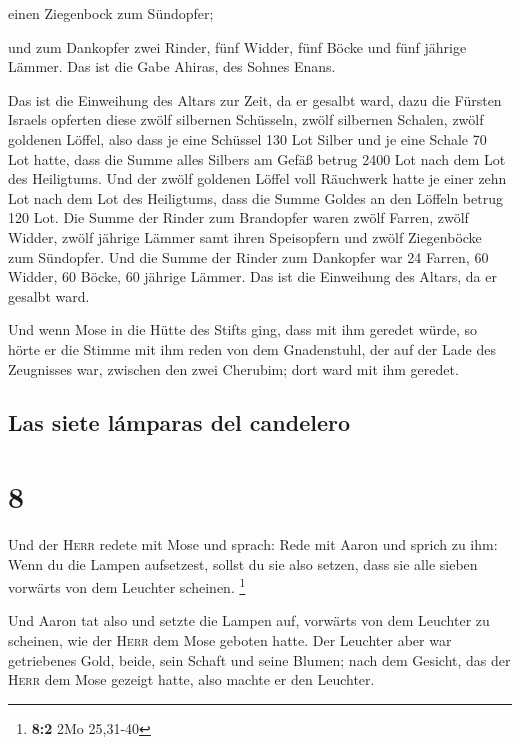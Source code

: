  einen Ziegenbock zum Sündopfer;

 und zum Dankopfer zwei Rinder, fünf Widder, fünf Böcke
und fünf jährige Lämmer. Das ist die Gabe Ahiras, des Sohnes Enans.

 Das ist die Einweihung des Altars zur Zeit, da er
gesalbt ward, dazu die Fürsten Israels opferten diese zwölf silbernen
Schüsseln, zwölf silbernen Schalen, zwölf goldenen Löffel,
 also dass je eine Schüssel 130 Lot Silber und je eine
Schale 70 Lot hatte, dass die Summe alles Silbers am Gefäß betrug 2400
Lot nach dem Lot des Heiligtums.  Und der zwölf goldenen
Löffel voll Räuchwerk hatte je einer zehn Lot nach dem Lot des
Heiligtums, dass die Summe Goldes an den Löffeln betrug 120 Lot.
 Die Summe der Rinder zum Brandopfer waren zwölf Farren,
zwölf Widder, zwölf jährige Lämmer samt ihren Speisopfern und zwölf
Ziegenböcke zum Sündopfer.  Und die Summe der Rinder zum
Dankopfer war 24 Farren, 60 Widder, 60 Böcke, 60 jährige Lämmer. Das ist
die Einweihung des Altars, da er gesalbt ward.

 Und wenn Mose in die Hütte des Stifts ging, dass mit ihm
geredet würde, so hörte er die Stimme mit ihm reden von dem Gnadenstuhl,
der auf der Lade des Zeugnisses war, zwischen den zwei Cherubim; dort
ward mit ihm geredet.

\hypertarget{las-siete-luxe1mparas-del-candelero}{%
\subsection{Las siete lámparas del
candelero}\label{las-siete-luxe1mparas-del-candelero}}

\hypertarget{section-7}{%
\section{8}\label{section-7}}

 Und der \textsc{Herr} redete mit Mose und sprach:
 Rede mit Aaron und sprich zu ihm: Wenn du die Lampen
aufsetzest, sollst du sie also setzen, dass sie alle sieben vorwärts von
dem Leuchter scheinen. \footnote{\textbf{8:2} 2Mo 25,31-40}

 Und Aaron tat also und setzte die Lampen auf, vorwärts
von dem Leuchter zu scheinen, wie der \textsc{Herr} dem Mose geboten
hatte.  Der Leuchter aber war getriebenes Gold, beide,
sein Schaft und seine Blumen; nach dem Gesicht, das der \textsc{Herr}
dem Mose gezeigt hatte, also machte er den Leuchter.

